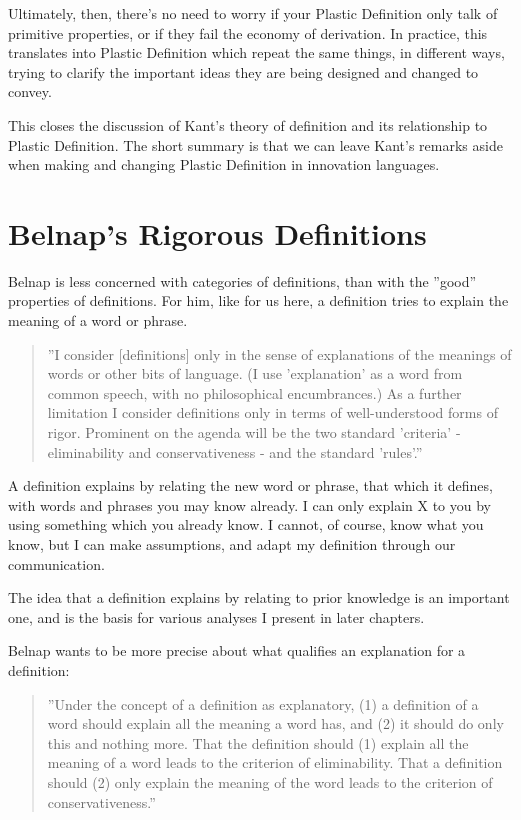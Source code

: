 \documentclass[graybox,envcountchap,sectrefs]{svmono}
\newcommand{\newdef}[1]{Plastic Definition}
\begin{document}
Ultimately, then, there's no need to worry if your \newdef s only talk of primitive properties, or if they fail the economy of derivation. In practice, this translates into \newdef s which repeat the same things, in different ways, trying to clarify the important ideas they are being designed and changed to convey.

This closes the discussion of Kant's theory of definition and its relationship to \newdef s. The short summary is that we can leave Kant's remarks aside when making and changing \newdef s in innovation languages.


\section{Belnap's Rigorous Definitions}
\label{c4:s3}
Belnap is less concerned with categories of definitions, than with the ''good'' properties of definitions. For him, like for us here, a definition tries to explain the meaning of a word or phrase.

\begin{quote}
''I consider [definitions] only in the sense of explanations of the meanings of words or other bits of language. (I use 'explanation' as a word from common speech, with no philosophical encumbrances.) As a further limitation I consider definitions only in terms of well-understood forms of rigor. Prominent on the agenda will be the two standard 'criteria' - eliminability and conservativeness - and the standard 'rules'.'' \cite{belnap1993rigorous}
\end{quote}

A definition explains by relating the new word or phrase, that which it defines, with words and phrases you may know already. I can only explain X to you by using something which you already know. I cannot, of course, know what you know, but I can make assumptions, and adapt my definition through our communication. 

The idea that a definition explains by relating to prior knowledge is an important one, and is the basis for various analyses I present in later chapters. 

Belnap wants to be more precise about what qualifies an explanation for a definition:

\begin{quote}
''Under the concept of a definition as explanatory, (1) a definition of a word should explain all the meaning a word has, and (2) it should do only this and nothing more. That the definition should (1) explain all the meaning of a word leads to the criterion of eliminability. That a definition should (2) only explain the meaning of the word leads to the criterion of conservativeness.'' \cite{belnap1993rigorous}
\end{quote}
\end{document}
